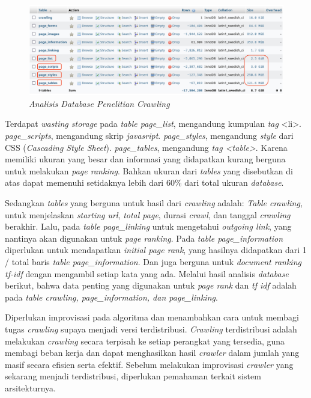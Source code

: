 \begin{figure}[H]
	\centering
	\includegraphics[width=1\textwidth]{gambar/db_analisis}
	\caption{\emph{Analisis Database Penelitian Crawling}}
	\label{gambar:db_analisis}
\end{figure}

Terdapat \emph{wasting storage} pada \emph{table page\_list}, mengandung kumpulan \emph{tag} <li>. \emph{page\_scripts}, mengandung skrip \emph{javasript}. \emph{page\_styles}, mengandung \emph{style} dari CSS (\emph{Cascading Style Sheet}). \emph{page\_tables}, mengandung \emph{tag <table>}. Karena memiliki ukuran yang besar dan informasi yang didapatkan kurang berguna untuk melakukan \emph{page ranking}. Bahkan ukuran dari \emph{tables} yang disebutkan di atas dapat memenuhi setidaknya lebih dari 60\% dari total ukuran \emph{database}.

Sedangkan \emph{tables} yang berguna untuk hasil dari \emph{crawling} adalah: \emph{Table crawling}, untuk menjelaskan \emph{starting url}, \emph{total page}, durasi \emph{crawl}, dan tanggal \emph{crawling} berakhir. Lalu, pada \emph{table page\_linking} untuk mengetahui \emph{outgoing link}, yang nantinya akan digunakan untuk \emph{page ranking}. Pada \emph{table page\_information} diperlukan untuk mendapatkan \emph{initial page rank}, yang hasilnya didapatkan dari 1 / total baris \emph{table page\_information}. Dan juga berguna untuk \emph{document ranking tf-idf} dengan mengambil setiap kata yang ada. Melalui hasil analisis \emph{database} berikut, bahwa data penting yang digunakan untuk \emph{page rank} dan \emph{tf idf} adalah pada \emph{table crawling, page\_information, dan page\_linking}.

Diperlukan improvisasi pada algoritma dan menambahkan cara untuk membagi tugas \emph{crawling} supaya menjadi versi terdistribusi. \emph{Crawling} terdistribusi adalah melakukan \emph{crawling} secara terpisah ke setiap perangkat yang tersedia, guna membagi beban kerja dan dapat menghasilkan hasil \emph{crawler} dalam jumlah yang masif secara efisien serta efektif. Sebelum melakukan improvisasi \emph{crawler} yang sekarang menjadi terdistribusi, diperlukan pemahaman terkait sistem arsitekturnya.

